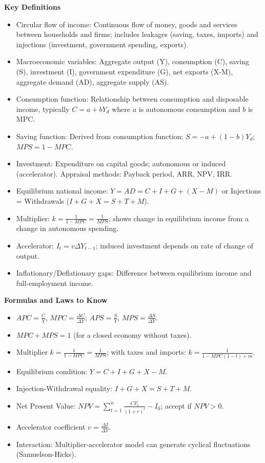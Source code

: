\documentclass[11pt]{article}
\newcommand{\cle}[1]{{\popxbold\color{popdark}#1}}
\begin{document}
\begin{bilan}
\textbf{Key Definitions}
\begin{itemize}
\item \cle{Circular flow of income}: Continuous flow of money, goods and services between households and firms; includes leakages (saving, taxes, imports) and injections (investment, government spending, exports).
\item \cle{Macroeconomic variables}: Aggregate output (Y), consumption (C), saving (S), investment (I), government expenditure (G), net exports (X-M), aggregate demand (AD), aggregate supply (AS).
\item \cle{Consumption function}: Relationship between consumption and disposable income, typically $C = a + bY_d$ where $a$ is autonomous consumption and $b$ is MPC.
\item \cle{Saving function}: Derived from consumption function: $S = -a + (1-b)Y_d$; $MPS = 1-MPC$.
\item \cle{Investment}: Expenditure on capital goods; autonomous or induced (accelerator). Appraisal methods: Payback period, ARR, NPV, IRR.
\item \cle{Equilibrium national income}: $Y = AD = C+I+G+(X-M)$ or Injections = Withdrawals ($I+G+X = S+T+M$).
\item \cle{Multiplier}: $k = \frac{1}{1-MPC} = \frac{1}{MPS}$; shows change in equilibrium income from a change in autonomous spending.
\item \cle{Accelerator}: $I_t = v\Delta Y_{t-1}$; induced investment depends on rate of change of output.
\item \cle{Inflationary/Deflationary gaps}: Difference between equilibrium income and full-employment income.
\end{itemize}

\textbf{Formulas and Laws to Know}
\begin{itemize}
\item $APC = \frac{C}{Y}$, $MPC = \frac{\Delta C}{\Delta Y}$; $APS = \frac{S}{Y}$, $MPS = \frac{\Delta S}{\Delta Y}$.
\item $MPC + MPS = 1$ (for a closed economy without taxes).
\item Multiplier $k = \frac{1}{1-MPC} = \frac{1}{MPS}$; with taxes and imports: $k = \frac{1}{1-MPC(1-t)+m}$.
\item Equilibrium condition: $Y = C + I + G + X - M$.
\item Injection-Withdrawal equality: $I + G + X = S + T + M$.
\item Net Present Value: $NPV = \sum_{t=1}^{n} \frac{CF_t}{(1+r)^t} - I_0$; accept if $NPV > 0$.
\item Accelerator coefficient $v = \frac{\Delta I}{\Delta Y}$.
\item Interaction: Multiplier-accelerator model can generate cyclical fluctuations (Samuelson-Hicks).
\end{itemize}


\end{bilan}
\end{document}
